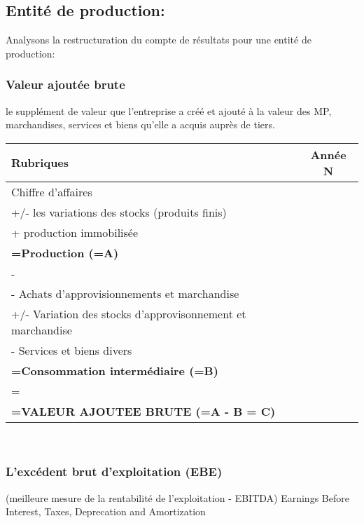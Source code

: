 \documentclass{article}
\begin{document}
\subsection{Entité de production:}
Analysons la restructuration du compte de résultats pour une entité de production:
\\

\subsubsection*{Valeur ajoutée brute}
 le supplément de valeur que l’entreprise a créé et ajouté à la valeur des MP, marchandises, services et biens qu’elle a acquis auprès de tiers. 
\begin{center}
\begin{tabular}{|l|c|}
    \hline
    \textbf{Rubriques} & \textbf{Année N}\\
    \hline
    Chiffre d'affaires & \\
    +/- les variations des stocks (produits finis) &\\
    + production immobilisée & \\
    \hline
    \multicolumn{2}{|l|}{\textbf{=Production (=A)}}   \\
    \hline
    \multicolumn{2}{l}{ - }\\
    \hline
     - Achats d'approvisionnements et marchandise & \\
     +/- Variation des stocks d'approvisonnement et marchandise & \\
     - Services et biens divers& \\
    \hline
    \multicolumn{2}{|l|}{\textbf{=Consommation intermédiaire (=B)}}   \\
    \hline
    \multicolumn{2}{l}{ = }\\
    \hline
    \multicolumn{2}{|l|}{\textbf{=VALEUR AJOUTEE BRUTE (=A - B = C)}}   \\
    \hline
\end{tabular}
\end{center}
\\ 
\subsubsection*{L'excédent brut d'exploitation (EBE)}
(meilleure mesure de la rentabilité de l’exploitation - EBITDA)
Earnings Before Interest, Taxes, Deprecation and Amortization
\end{document}
